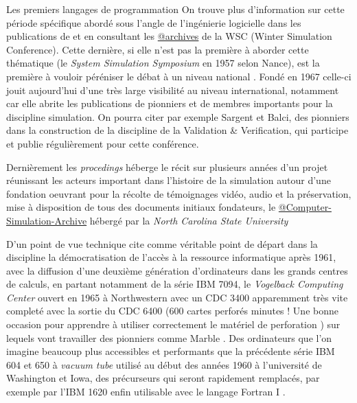\begin{framewithtitle}{ Les premiers langages de programmation }
On trouve plus d'information sur cette période spécifique abordé sous l'angle de l'ingénierie logicielle dans les publications de \textcites{Nance2013,Nance1993, Araten1992, Nance2002} et en consultant les \href{http://informs-sim.org/}{@archives} de la WSC (Winter Simulation Conference). Cette dernière, si elle n'est pas la première à aborder cette thématique (le \textit{System Simulation Symposium} en 1957 selon Nance), est la première à vouloir péréniser le débat à un niveau national \autocite{Nance2002}. Fondé en 1967 \autocite{Crain1992, Araten1992} celle-ci jouit aujourd'hui d'une très large visibilité au niveau international, notamment car elle abrite les publications de pionniers et de membres importants pour la discipline simulation. On pourra citer par exemple Sargent et Balci, des pionniers dans la construction de la discipline de la Validation \& Verification, qui participe et publie régulièrement pour cette conférence. 

Dernièrement les \textit{procedings} héberge le récit sur plusieurs années d'un projet \autocite{Nance2013} réunissant les acteurs important dans l'histoire de la simulation autour d'une fondation oeuvrant pour la récolte de témoignages vidéo, audio et la préservation, mise à disposition de tous des documents initiaux fondateurs, le \href{http://d.lib.ncsu.edu/computer-simulation/}{@Computer-Simulation-Archive} hébergé par la \textit{North Carolina State University}

\end{framewithtitle}

D'un point de vue technique \textcite{Haggett1969} cite comme véritable point de départ dans la discipline la démocratisation de l'accès à la ressource informatique après 1961, avec la diffusion d'une deuxième génération d'ordinateurs dans les grands centres de calculs, en partant notamment de la série IBM 7094, le \textit{Vogelback Computing Center} ouvert en 1965 à Northwestern avec un CDC 3400 apparemment très vite completé avec la sortie du CDC 6400 (600 cartes perforés minutes ! Une bonne occasion pour apprendre à utiliser correctement le matériel de perforation \autocite{Fisk2005}) sur lequels vont travailler des pionniers comme Marble . Des ordinateurs que l'on imagine beaucoup plus accessibles et performants que la précédente série IBM 604 et 650  \autocite[584]{Barnes2004} à \textit{vacuum tube} utilisé au début des années 1960 à l'université de Washington  et Iowa, des précurseurs qui seront rapidement remplacés, par exemple par l'IBM 1620 enfin utilisable avec le langage Fortran I \autocite[66]{Berry2005}. 

